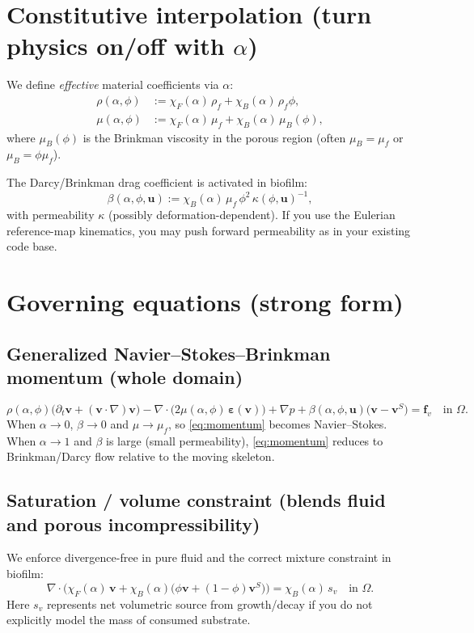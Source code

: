 \documentclass[11pt]{article}
\newcommand{\grad}{\nabla}
\newcommand{\divv}{\nabla\!\cdot}
\newcommand{\eps}{\bm{\varepsilon}}
\newcommand{\Dt}{\partial_t}
\begin{document}
\section{Constitutive interpolation (turn physics on/off with $\alpha$)}

We define \emph{effective} material coefficients via $\alpha$:
\begin{align*}
\rho(\alpha,\phi) &:= \chi_F(\alpha)\,\rho_f + \chi_B(\alpha)\,\rho_f \phi, \\
\mu(\alpha,\phi) &:= \chi_F(\alpha)\,\mu_f + \chi_B(\alpha)\,\mu_B(\phi),
\end{align*}
where $\mu_B(\phi)$ is the Brinkman viscosity in the porous region (often $\mu_B=\mu_f$ or $\mu_B=\phi\mu_f$).

The Darcy/Brinkman drag coefficient is activated in biofilm:
\[
\boxed{
\beta(\alpha,\phi,\bm{u}) := \chi_B(\alpha)\,\mu_f\,\phi^2\,\kappa(\phi,\bm{u})^{-1},
}
\]
with permeability $\kappa$ (possibly deformation-dependent). If you use the Eulerian reference-map kinematics, you may push forward permeability as in your existing code base.

\section{Governing equations (strong form)}

\subsection{Generalized Navier--Stokes--Brinkman momentum (whole domain)}
\begin{equation}\label{eq:momentum}
\rho(\alpha,\phi)\Big(\Dt \bm{v} + (\bm{v}\cdot\grad)\bm{v}\Big)
-\divv\big(2\mu(\alpha,\phi)\,\eps(\bm{v})\big) + \grad p
+ \beta(\alpha,\phi,\bm{u})\big(\bm{v}-\bm{v}^S\big)
= \bm{f}_v
\quad \text{in }\Omega.
\end{equation}
When $\alpha\to 0$, $\beta\to 0$ and $\mu\to\mu_f$, so \eqref{eq:momentum} becomes Navier--Stokes.
When $\alpha\to 1$ and $\beta$ is large (small permeability), \eqref{eq:momentum} reduces to Brinkman/Darcy flow relative to the moving skeleton.

\subsection{Saturation / volume constraint (blends fluid and porous incompressibility)}
We enforce divergence-free in pure fluid and the correct mixture constraint in biofilm:
\begin{equation}\label{eq:mass}
\divv\Big(\chi_F(\alpha)\,\bm{v} + \chi_B(\alpha)\big(\phi\bm{v}+(1-\phi)\bm{v}^S\big)\Big)
= \chi_B(\alpha)\,s_v
\quad \text{in }\Omega.
\end{equation}
Here $s_v$ represents net volumetric source from growth/decay if you do not explicitly model the mass of consumed substrate.
\end{document}
